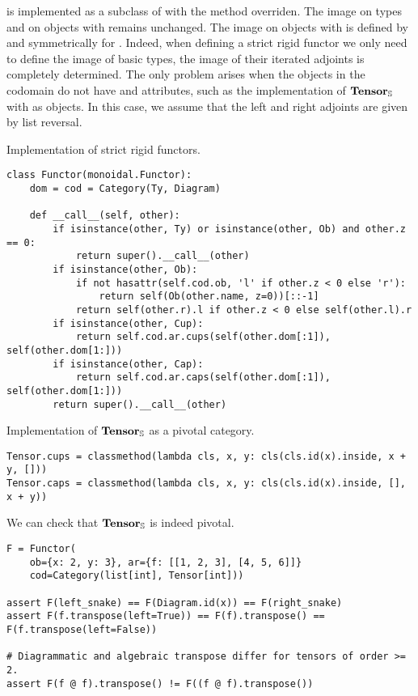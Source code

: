  is implemented as a subclass of  with the  method overriden.
The image on types and on objects  with  remains unchanged.
The image on objects  with  is defined by  and symmetrically for .
Indeed, when defining a strict rigid functor we only need to define the image of basic types, the image of their iterated adjoints is completely determined.
The only problem arises when the objects in the codomain do not have  and  attributes, such as the implementation of $\mathbf{Tensor}_\S$ with  as objects.
In this case, we assume that the left and right adjoints are given by list reversal.

\begin{python}
{\normalfont Implementation of strict rigid functors.}
\begin{verbatim}
class Functor(monoidal.Functor):
    dom = cod = Category(Ty, Diagram)

    def __call__(self, other):
        if isinstance(other, Ty) or isinstance(other, Ob) and other.z == 0:
            return super().__call__(other)
        if isinstance(other, Ob):
            if not hasattr(self.cod.ob, 'l' if other.z < 0 else 'r'):
                return self(Ob(other.name, z=0))[::-1]
            return self(other.r).l if other.z < 0 else self(other.l).r
        if isinstance(other, Cup):
            return self.cod.ar.cups(self(other.dom[:1]), self(other.dom[1:]))
        if isinstance(other, Cap):
            return self.cod.ar.caps(self(other.dom[:1]), self(other.dom[1:]))
        return super().__call__(other)
\end{verbatim}
\end{python}

\begin{python}
{\normalfont Implementation of $\mathbf{Tensor}_\S$ as a pivotal category.}
\begin{verbatim}
Tensor.cups = classmethod(lambda cls, x, y: cls(cls.id(x).inside, x + y, []))
Tensor.caps = classmethod(lambda cls, x, y: cls(cls.id(x).inside, [], x + y))
\end{verbatim}
\end{python}

\begin{example}
We can check that $\mathbf{Tensor}_\S$ is indeed pivotal.

\begin{verbatim}
F = Functor(
    ob={x: 2, y: 3}, ar={f: [[1, 2, 3], [4, 5, 6]]}
    cod=Category(list[int], Tensor[int]))

assert F(left_snake) == F(Diagram.id(x)) == F(right_snake)
assert F(f.transpose(left=True)) == F(f).transpose() == F(f.transpose(left=False))

# Diagrammatic and algebraic transpose differ for tensors of order >= 2.
assert F(f @ f).transpose() != F((f @ f).transpose())
\end{verbatim}
\end{example}

